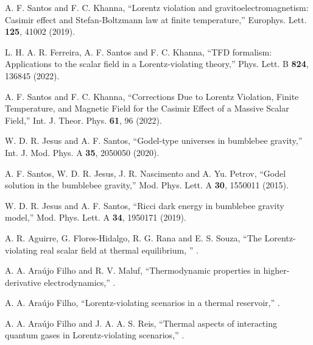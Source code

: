 \documentclass[11pt,showpacs,preprintnumbers,amsmath,amssymb,prd,nofootinbib,superscriptaddress]{revtex4-2}
\begin{document}
{\begin{thebibliography}{99}
 A. F. Santos and F. C. Khanna, ``Lorentz violation and gravitoelectromagnetism: Casimir effect and Stefan-Boltzmann law at finite temperature,''  {Europhys. Lett. \textbf{125}, 41002 (2019)}.

 L. H. A. R. Ferreira, A. F. Santos and F. C. Khanna, ``TFD formalism: Applications to the scalar field in a Lorentz-violating theory,''  {Phys. Lett. B \textbf{824}, 136845 (2022)}.

 A. F. Santos and F. C. Khanna, ``Corrections Due to Lorentz Violation, Finite Temperature, and Magnetic Field for the Casimir Effect of a Massive Scalar Field,''  {Int. J. Theor. Phys. \textbf{61}, 96 (2022)}.

 W. D. R. Jesus and A. F. Santos, ``Godel-type universes in bumblebee gravity,''  {Int. J. Mod. Phys. A \textbf{35}, 2050050 (2020)}.

 A. F. Santos, W. D. R. Jesus, J. R. Nascimento and A. Yu. Petrov, ``Godel solution in the bumblebee gravity,''  {Mod. Phys. Lett. A \textbf{30}, 1550011 (2015)}.

 W. D. R. Jesus and A. F. Santos, ``Ricci dark energy in bumblebee gravity model,''  {Mod. Phys. Lett. A \textbf{34}, 1950171 (2019)}.

 A. R. Aguirre, G. Flores-Hidalgo, R. G. Rana and E. S. Souza, ``The Lorentz-violating real scalar field at thermal equilibrium, '' .

 A. A. Ara\'{u}jo Filho and R. V. Maluf, ``Thermodynamic properties in higher-derivative electrodynamics,'' .

 A. A. Ara\'{u}jo Filho, ``Lorentz-violating scenarios in a thermal reservoir,'' .

 A. A. Ara\'{u}jo Filho and J. A. A. S. Reis, ``Thermal aspects of interacting quantum gases in Lorentz-violating scenarios,'' .


\end{thebibliography}}
\end{document}

